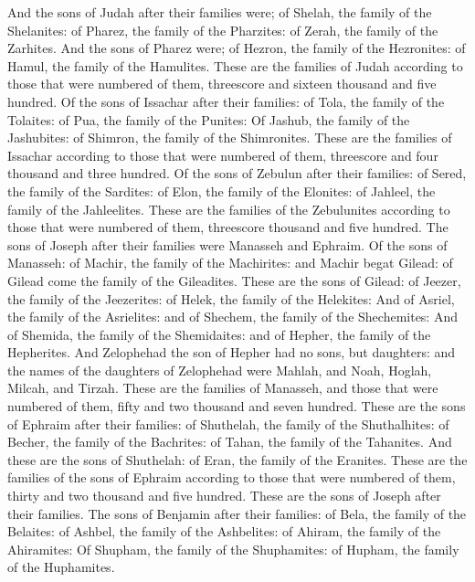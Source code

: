 \begin{biblechapter}
\verse And the sons of Judah after their families were; of Shelah, the family of the Shelanites: of Pharez, the family of the Pharzites: of Zerah, the family of the Zarhites.
\verse And the sons of Pharez were; of Hezron, the family of the Hezronites: of Hamul, the family of the Hamulites.
\verse These are the families of Judah according to those that were numbered of them, threescore and sixteen thousand and five hundred.
\verse Of the sons of Issachar after their families: of Tola, the family of the Tolaites: of Pua, the family of the Punites:
\verse Of Jashub, the family of the Jashubites: of Shimron, the family of the Shimronites.
\verse These are the families of Issachar according to those that were numbered of them, threescore and four thousand and three hundred.
\verse Of the sons of Zebulun after their families: of Sered, the family of the Sardites: of Elon, the family of the Elonites: of Jahleel, the family of the Jahleelites.
\verse These are the families of the Zebulunites according to those that were numbered of them, threescore thousand and five hundred.
\verse The sons of Joseph after their families were Manasseh and Ephraim.
\verse Of the sons of Manasseh: of Machir, the family of the Machirites: and Machir begat Gilead: of Gilead come the family of the Gileadites.
\verse These are the sons of Gilead: of Jeezer, the family of the Jeezerites: of Helek, the family of the Helekites:
\verse And of Asriel, the family of the Asrielites: and of Shechem, the family of the Shechemites:
\verse And of Shemida, the family of the Shemidaites: and of Hepher, the family of the Hepherites.
\verse And Zelophehad the son of Hepher had no sons, but daughters: and the names of the daughters of Zelophehad were Mahlah, and Noah, Hoglah, Milcah, and Tirzah.
\verse These are the families of Manasseh, and those that were numbered of them, fifty and two thousand and seven hundred.
\verse These are the sons of Ephraim after their families: of Shuthelah, the family of the Shuthalhites: of Becher, the family of the Bachrites: of Tahan, the family of the Tahanites.
\verse And these are the sons of Shuthelah: of Eran, the family of the Eranites.
\verse These are the families of the sons of Ephraim according to those that were numbered of them, thirty and two thousand and five hundred. These are the sons of Joseph after their families.
\verse The sons of Benjamin after their families: of Bela, the family of the Belaites: of Ashbel, the family of the Ashbelites: of Ahiram, the family of the Ahiramites:
\verse Of Shupham, the family of the Shuphamites: of Hupham, the family of the Huphamites.

\end{biblechapter}
